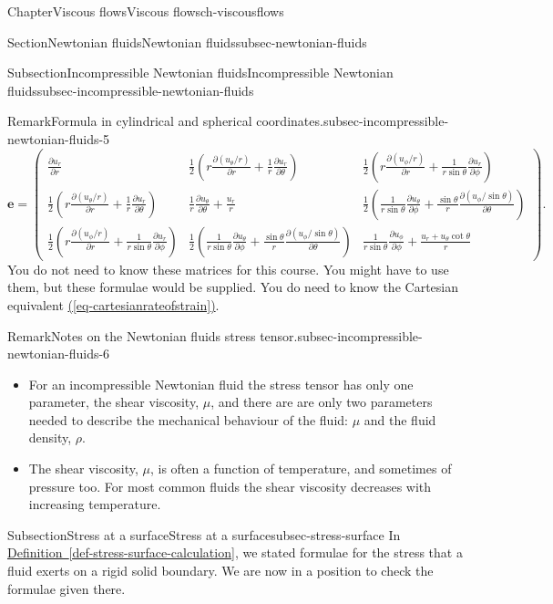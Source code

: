 \documentclass[oneside,10pt,]{book}
\newcommand{\xreffont}{\relax}
\newcommand{\ptxlistdisc}{\raisebox{0.3ex}{\textbullet}}
\numberwithin{equation}{section}
\newcommand{\pd}[2]{\frac{\partial#1}{\partial#2}}
\newcommand{\be}{\boldsymbol{e}}
\begin{document}
\begin{chapterptx}{Chapter}{Viscous flows}{}{Viscous flows}{}{}{ch-viscousflows}
\begin{sectionptx}{Section}{Newtonian fluids}{}{Newtonian fluids}{}{}{subsec-newtonian-fluids}
\begin{subsectionptx}{Subsection}{Incompressible Newtonian fluids}{}{Incompressible Newtonian fluids}{}{}{subsec-incompressible-newtonian-fluids}
\begin{remark}{Remark}{Formula in cylindrical and spherical coordinates.}{subsec-incompressible-newtonian-fluids-5}
\begin{equation}
\be=\left(\begin{matrix}
\pd{u_r}{r}&\frac12\left(r\pd{(u_\theta/r)}{r}+\frac1r\pd{u_r}{\theta}\right)&\frac12\left(r\pd{(u_\phi/r)}{r}+\frac1{r\sin\theta}\pd{u_r}{\phi}\right)\\
\frac12\left(r\pd{(u_\theta/r)}{r}+\frac1r\pd{u_r}{\theta}\right)&\frac1r\pd{u_\theta}{\theta}+\frac{u_r}{r}&\frac12\left(\frac1{r\sin\theta}\pd{u_\theta}{\phi}+\frac{\sin\theta}{r}\pd{(u_\phi/\sin\theta)}{\theta}\right)\\
\frac12\left(r\pd{(u_\phi/r)}{r}+\frac1{r\sin\theta}\pd{u_r}{\phi}\right)&\frac12\left(\frac1{r\sin\theta}\pd{u_\theta}{\phi}+\frac{\sin\theta}r\pd{(u_\phi/\sin\theta)}{\theta}\right)&\frac1{r\sin\theta}\pd{u_\phi}{\phi}+\frac{u_r+u_\theta\cot\theta}{r}
\end{matrix}\right).\label{eq-eincylsph}
\end{equation}
You do not need to know these matrices for this course. You might have to use them, but these formulae would be supplied. You do need to know the Cartesian equivalent \hyperref[eq-cartesianrateofstrain]{({\xreffont\ref{eq-cartesianrateofstrain}})}.%
\end{remark}
\begin{remark}{Remark}{Notes on the Newtonian fluids stress tensor.}{subsec-incompressible-newtonian-fluids-6}%
%
\begin{itemize}[label=\ptxlistdisc]
\item{}For an incompressible Newtonian fluid the stress tensor has only one parameter, the shear viscosity, \(\mu\), and there are are only two parameters needed to describe the mechanical behaviour of the fluid: \(\mu\) and the fluid density, \(\rho\).%
\item{}The shear viscosity, \(\mu\), is often a function of temperature, and sometimes of pressure too. For most common fluids the shear viscosity decreases with increasing temperature.%
\end{itemize}
%
\end{remark}
\end{subsectionptx}
%
%
\typeout{************************************************}
\typeout{************************************************}
%
\begin{subsectionptx}{Subsection}{Stress at a surface}{}{Stress at a surface}{}{}{subsec-stress-surface}
In \hyperref[def-stress-surface-calculation]{Definition~{\xreffont\ref{def-stress-surface-calculation}}}, we stated formulae for the stress that a fluid exerts on a rigid solid boundary. We are now in a position to check the formulae given there.%

\end{subsectionptx}
\end{sectionptx}
\end{chapterptx}
\end{document}
